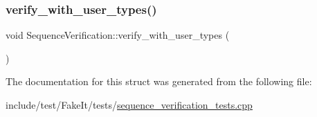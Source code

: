 \mbox{\label{structSequenceVerification_aae1f93a5f98cf06f3948d44d24cd9a1b}} 
\subsubsection{\texorpdfstring{verify\_with\_user\_types()}{verify\_with\_user\_types()}}
{\footnotesize\ttfamily void Sequence\+Verification\+::verify\+\_\+with\+\_\+user\+\_\+types (\begin{DoxyParamCaption}{ }\end{DoxyParamCaption})\hspace{0.3cm}{\ttfamily [inline]}}



The documentation for this struct was generated from the following file\+:\begin{DoxyCompactItemize}
\item 
include/test/\+Fake\+It/tests/\mbox{\hyperlink{sequence__verification__tests_8cpp}{sequence\+\_\+verification\+\_\+tests.\+cpp}}\end{DoxyCompactItemize}
